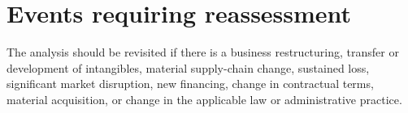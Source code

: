 \section{Events requiring reassessment}
The analysis should be revisited if there is a business restructuring, transfer
or development of intangibles, material supply-chain change, sustained loss,
significant market disruption, new financing, change in contractual terms,
material acquisition, or change in the applicable law or administrative
practice.

